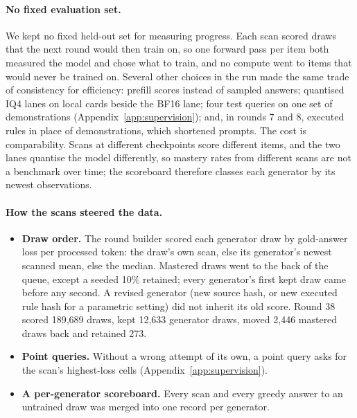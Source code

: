\documentclass[11pt]{article}
\begin{document}
\paragraph{No fixed evaluation set.} We kept no fixed held-out set for
measuring progress. Each scan scored draws that the next round would then train
on, so one forward pass per item both measured the model and chose what to
train, and no compute went to items that would never be trained on. Several
other choices in the run made the same trade of consistency for efficiency:
prefill scores instead of sampled answers; quantised IQ4 lanes on local cards
beside the BF16 lane; four test queries on one set of demonstrations
(Appendix~\ref{app:supervision}); and, in rounds 7 and 8, executed rules in
place of demonstrations, which shortened prompts. The cost is comparability.
Scans at different checkpoints score different items, and the two lanes
quantise the model differently, so mastery rates from different scans are not
a benchmark over time; the scoreboard therefore classes each generator by its
newest observations.

\paragraph{How the scans steered the data.}
\begin{itemize}[nosep]
  \item \textbf{Draw order.} The round builder scored each generator draw by gold-answer loss per processed token: the draw's own scan, else its generator's newest scanned mean, else the median. Mastered draws went to the back of the queue, except a seeded 10\% retained; every generator's first kept draw came before any second. A revised generator (new source hash, or new executed rule hash for a parametric setting) did not inherit its old score. Round 38 scored 189,689 draws, kept 12,633 generator draws, moved 2,446 mastered draws back and retained 273.
  \item \textbf{Point queries.} Without a wrong attempt of its own, a point query asks for the scan's highest-loss cells (Appendix~\ref{app:supervision}).
  \item \textbf{A per-generator scoreboard.} Every scan and every greedy answer to an untrained draw was merged into one record per generator.
\end{itemize}
\end{document}
